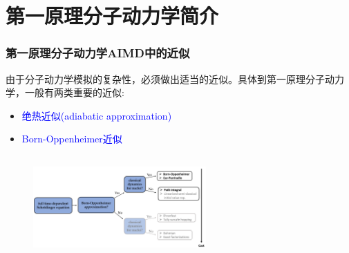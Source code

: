 \section{第一原理分子动力学简介}
\frame
{
	\frametitle{第一原理分子动力学\textrm{AIMD}中的近似}
	由于分子动力学模拟的复杂性，必须做出适当的近似。具体到第一原理分子动力学，一般有两类重要的近似:
	\begin{itemize}
		\item \textcolor{blue}{绝热近似\textrm{(adiabatic approximation)}}\\
			{\fontsize{6.2pt}{4.2pt}\selectfont{假设电子-原子核在能量层面上完全分离，彼此间没有能量传递}}
		\item \textcolor{blue}{\textrm{Born-Oppenheimer}近似}\\
			{\fontsize{6.2pt}{4.2pt}}
	\end{itemize}
\begin{figure}[h!]
\centering
\vspace*{-0.25in}
\includegraphics[height=1.55in,width=2.6in,viewport=0 0 440 230,clip]{Figures/Molecular-dynamics_Claaified.png}
\label{Molecular-dynamics_Classified}
\end{figure}
}

